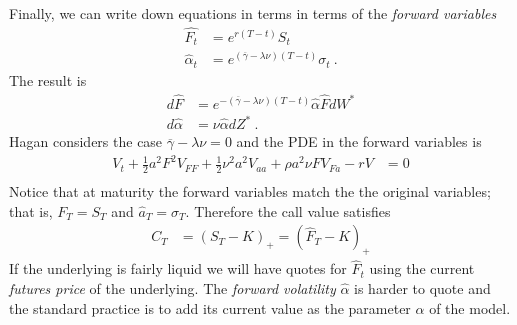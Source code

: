 \documentclass[10pt]{article}
\numberwithin{equation}{section}
\begin{document}
Finally, we can write down equations in terms in terms of the \emph{forward variables}
\begin{equation*}
	\begin{split}
	 \widehat{F_t} &= e^{r(T-t)} S_t \\
	 \widehat{\alpha}_t &= e^{(\overline{\gamma}-\lambda \nu)(T-t)}\sigma_t \:. 
	\end{split}
\end{equation*}
The result is
\begin{equation}\label{SABR}
	\begin{split}
		d\widehat{F} &= e^{-(\overline{\gamma}-\lambda \nu)(T-t)}\widehat{\alpha} \widehat{F} dW^{*}\\
		d \widehat{\alpha }&= \nu \widehat{\alpha} dZ^{*}\:.
	\end{split}
\end{equation}
Hagan considers the case $\overline{\gamma}-\lambda \nu=0$ and the PDE in the forward variables is
\begin{equation}
	\begin{split}
	V_t + \frac{1}{2} a^2 F^2 V_{FF}+ \frac{1}{2} \nu^2 a^2 V_{aa}  + \rho a^2 \nu F V_{Fa} - r V&=0\\
	\end{split}
\end{equation}
Notice that at maturity the forward variables match the the original variables; that is, $F_T=S_T$ and $\widehat{a}_T = \sigma_{T}$. Therefore the call value satisfies
\begin{equation*}
	\begin{split}
		C_{T} &= (S_T - K)_{+}= (\widehat{F}_T-K)_{+}
	\end{split}
\end{equation*}
If the underlying is fairly liquid we will have quotes for $\widehat{F}_{t}$ using the current \emph{futures price} of the underlying. The \emph{forward volatility} $\widehat{\alpha}$ is harder to quote and the standard practice is to add its current value as the parameter $\alpha$ of the model.
\end{document}

